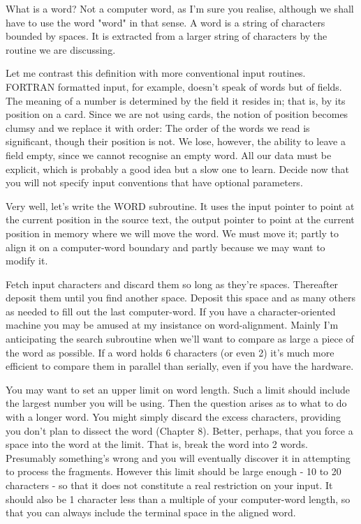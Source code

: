 \documentclass[b5paper, oneside]{book}
\begin{document}
What is a word? Not a computer word, as I'm sure you realise, although we shall have to use the word "word" in that sense. A word is a string of characters bounded by spaces. It is extracted from a larger string of characters by the routine we are discussing.

Let me contrast this definition with more conventional input routines. FORTRAN formatted input, for example, doesn't speak of words but of fields. The meaning of a number is determined by the field it resides in; that is, by its position on a card. Since we are not using cards, the notion of position becomes clumsy and we replace it with order: The order of the words we read is significant, though their position is not. We lose, however, the ability to leave a field empty, since we cannot recognise an empty word. All our data must be explicit, which is probably a good idea but a slow one to learn. Decide now that you will not specify input conventions that have optional parameters.

Very well, let's write the WORD subroutine. It uses the input pointer to point at the current position in the source text, the output pointer to point at the current position in memory where we will move the word. We must move it; partly to align it on a computer-word boundary and partly because we may want to modify it.

Fetch input characters and discard them so long as they're spaces. Thereafter deposit them until you find another space. Deposit this space and as many others as needed to fill out the last computer-word. If you have a character-oriented machine you may be amused at my insistance on word-alignment. Mainly I'm anticipating the search subroutine when we'll want to compare as large a piece of the word as possible. If a word holds 6 characters (or even 2) it's much more efficient to compare them in parallel than serially, even if you have the hardware.

You may want to set an upper limit on word length. Such a limit should include the largest number you will be using. Then the question arises as to what to do with a longer word. You might simply discard the excess characters, providing you don't plan to dissect the word (Chapter 8). Better, perhaps, that you force a space into the word at the limit. That is, break the word into 2 words. Presumably something's wrong and you will eventually discover it in attempting to process the fragments. However this limit should be large enough - 10 to 20 characters - so that it does not constitute a real restriction on your input. It should also be 1 character less than a multiple of your computer-word length, so that you can always include the terminal space in the aligned word.
\end{document}
